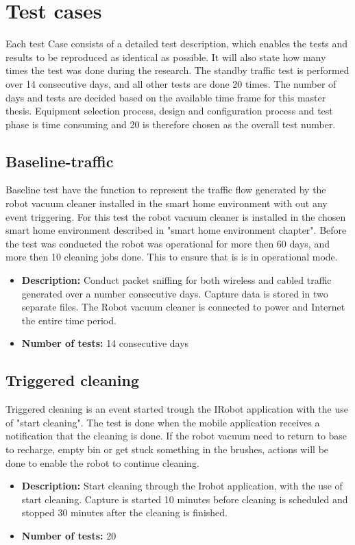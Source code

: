 \section{Test cases}
Each test Case consists of a detailed test description, which enables the tests and results to be reproduced as identical as possible. It will also state how many times the test was done during the research. The standby traffic test is performed over 14 consecutive days, and all other tests are done 20 times. The number of days and tests are decided based on the available time frame for this master thesis. Equipment selection process, design and configuration process and test phase is time consuming and 20 is therefore chosen as the overall test number. 

\subsection{Baseline-traffic}
Baseline test have the function to represent the traffic flow generated by the robot vacuum cleaner installed in the smart home environment with out any event triggering. For this test the robot vacuum cleaner is installed in the chosen smart home environment described in "smart home environment chapter". Before the test was conducted the robot was operational for more then 60 days, and more then 10 cleaning jobs done. This to ensure that is is in operational mode.

\begin{itemize}
    \item \textbf{Description:} Conduct packet sniffing for both wireless and cabled traffic generated over a number consecutive days. Capture data is stored in two separate files. The Robot vacuum cleaner is connected to power and Internet the entire time period.
    \item \textbf{Number of tests:} 14 consecutive days
\end{itemize}

\subsection{Triggered cleaning}
Triggered cleaning is an event started trough the IRobot application with the use of "start cleaning". The test is done when the mobile application receives a notification that the cleaning is done. If the robot vacuum need to return to base to recharge, empty bin or get stuck something in the brushes, actions will be done to enable the robot to continue cleaning. 
\begin{itemize}
    \item \textbf{Description:} Start cleaning through the Irobot application, with the use of start cleaning. Capture is started 10 minutes before cleaning is scheduled and stopped 30 minutes after the cleaning is finished. 
    \item \textbf{Number of tests:} 20
\end{itemize}


